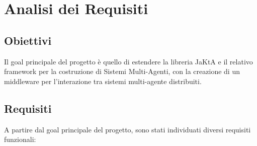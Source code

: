 \section{Analisi dei Requisiti}

%
%

%

\subsection{Obiettivi}

Il goal principale del progetto è quello di estendere la libreria JaKtA e il relativo framework per la costruzione di Sistemi Multi-Agenti,
con la creazione di un middleware per l'interazione tra sistemi multi-agente distribuiti.

\subsection{Requisiti}
A partire dal goal principale del progetto, sono stati individuati diversi requisiti funzionali:


